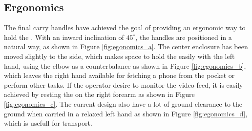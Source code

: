 \subsection{Ergonomics}
The final carry handles have achieved the goal of providing an ergonomic way to hold the \sr.
With an inward inclination of $45^{\circ}$, the handles are positioned in a natural way, as shown in Figure \ref{fig:egonomics_a}.
The center enclosure has been moved slightly to the side, which makes space to hold the \sr easily with the left hand, using the elbow as a counterbalance as shown in Figure \ref{fig:egonomics_b}, which leaves the right hand available for fetching a phone from the pocket or perform other tasks.
If the operator desire to monitor the video feed, it is easily achieved by resting the \sr on the right forearm as shown in Figure \ref{fig:egonomics_c}.
The current design also have a lot of ground clearance to the ground when carried in a relaxed left hand as shown in Figure \ref{fig:egonomics_d}, which is usefull for transport.

